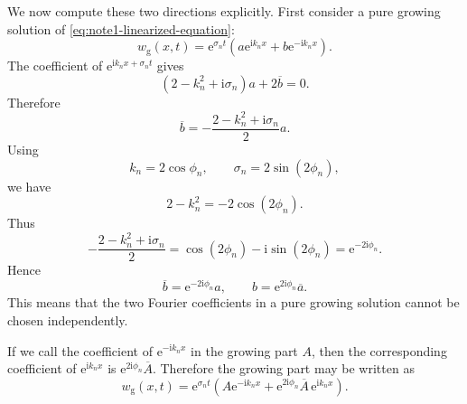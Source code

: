 \documentclass{amsart}
\newcounter{note}
\numberwithin{equation}{hw}
\begin{document}
We now compute these two directions explicitly.  First consider a pure
growing solution of \eqref{eq:note1-linearized-equation}:
\begin{equation}
w_{\mathrm{g}}(x,t)
=
\mathrm{e}^{\sigma_nt}
\left(
a\mathrm{e}^{\mathrm{i}k_nx}
+
b\mathrm{e}^{-\mathrm{i}k_nx}
\right).
\label{eq:note1-pure-growing}
\end{equation}
The coefficient of
\(\mathrm{e}^{\mathrm{i}k_nx+\sigma_nt}\) gives
\begin{equation}
\left(2-k_n^2+\mathrm{i}\sigma_n\right)a
+
2\overline{b}
=0.
\label{eq:note1-growing-eigenvector-equation}
\end{equation}
Therefore
\begin{equation}
\overline{b}
=
-\frac{2-k_n^2+\mathrm{i}\sigma_n}{2}a.
\label{eq:note1-bbar-ratio-pre}
\end{equation}
Using
\begin{equation}
k_n=2\cos\phi_n,
\qquad
\sigma_n=2\sin(2\phi_n),
\label{eq:note1-k-sigma-trig}
\end{equation}
we have
\begin{equation}
2-k_n^2
=
-2\cos(2\phi_n).
\label{eq:note1-two-minus-k-square}
\end{equation}
Thus
\begin{equation}
-\frac{2-k_n^2+\mathrm{i}\sigma_n}{2}
=
\cos(2\phi_n)-\mathrm{i}\sin(2\phi_n)
=
\mathrm{e}^{-2\mathrm{i}\phi_n}.
\label{eq:note1-growing-ratio}
\end{equation}
Hence
\begin{equation}
\overline{b}=\mathrm{e}^{-2\mathrm{i}\phi_n}a,
\qquad
b=\mathrm{e}^{2\mathrm{i}\phi_n}\overline{a}.
\label{eq:note1-growing-relation}
\end{equation}
This means that the two Fourier coefficients in a pure growing solution
cannot be chosen independently.

If we call the coefficient of
\(\mathrm{e}^{-\mathrm{i}k_nx}\) in the growing part \(A\), then the
corresponding coefficient of \(\mathrm{e}^{\mathrm{i}k_nx}\) is
\(\mathrm{e}^{2\mathrm{i}\phi_n}\overline{A}\).  Therefore the growing
part may be written as
\begin{equation}
w_{\mathrm{g}}(x,t)
=
\mathrm{e}^{\sigma_nt}
\left(
A\mathrm{e}^{-\mathrm{i}k_nx}
+
\mathrm{e}^{2\mathrm{i}\phi_n}\overline{A}\,
\mathrm{e}^{\mathrm{i}k_nx}
\right).
\label{eq:note1-growing-A-form}
\end{equation}
\end{document}
